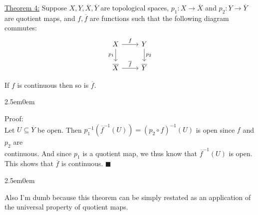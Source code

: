 \documentclass{book}
\newcommand{\myComment}{%
   \color{RawerSienna}%
   \fontsize{12}{14}\selectfont%
}
\newcommand{\pracTwo}{
   \color{Orange}%
   \fontsize{12}{14}\selectfont%
}
\newenvironment{myIndent}{%
   \begin{adjustwidth}{2.5em}{0em}%
}{%
   \end{adjustwidth}%
}
\begin{document}
\ul{Theorem 4:} Suppose $X, Y, \overline{X}, \overline{Y}$ are topological spaces, $p_1: X \to \overline{X}$ and $p_2: Y \to \overline{Y}$ are quotient maps, and $f, \overline{f}$ are functions such that the following diagram commutes:
\[\begin{tikzcd}
	X & Y \\
	{\overline{X}} & {\overline{Y}}
	\arrow["f", from=1-1, to=1-2]
	\arrow["{p_1}"', from=1-1, to=2-1]
	\arrow["{p_2}", from=1-2, to=2-2]
	\arrow["{\overline{f}}", from=2-1, to=2-2]
\end{tikzcd}\]

If $f$ is continuous then so is $\overline{f}$.
\begin{myIndent}\pracTwo
	Proof:\\
	Let $U \subseteq \overline{Y}$ be open. Then $p_1^{-1}(\overline{f}^{-1}(U)) = (p_2 \circ f)^{-1}(U)$ is open since $f$ and $p_2$ are\\ [-1pt] continuous. And since $p_1$ is a quotient map, we thus know that $\overline{f}^{-1}(U)$ is open. This shows that $\overline{f}$ is continuous. $\blacksquare$
	\begin{myIndent}\myComment
		Also I'm dumb because this theorem can be simply restated as an application of the universal property of quotient maps.\newpage
	\end{myIndent}
\end{myIndent}
\end{document}
